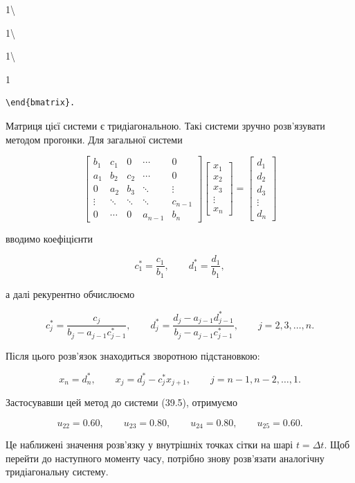 \documentclass[
  ukrainian,
]{article}
\begin{document}
1\textbackslash{}

1\textbackslash{}

1\textbackslash{}

1

\begin{verbatim}
\end{bmatrix}.
\end{verbatim}

Матриця цієї системи є тридіагональною. Такі системи зручно розв'язувати
методом прогонки. Для загальної системи

\[
\begin{bmatrix}
b_1 & c_1 & 0 & \cdots & 0\\
a_1 & b_2 & c_2 & \cdots & 0\\
0 & a_2 & b_3 & \ddots & \vdots\\
\vdots & \ddots & \ddots & \ddots & c_{n-1}\\
0 & \cdots & 0 & a_{n-1} & b_n
\end{bmatrix}
\begin{bmatrix}
x_1\\
x_2\\
x_3\\
\vdots\\
x_n
\end{bmatrix}
=
\begin{bmatrix}
d_1\\
d_2\\
d_3\\
\vdots\\
d_n
\end{bmatrix}
\]

вводимо коефіцієнти

\[
c_1^*=\frac{c_1}{b_1},\qquad d_1^*=\frac{d_1}{b_1},
\]

а далі рекурентно обчислюємо

\[
c_j^*=\frac{c_j}{b_j-a_{j-1}c_{j-1}^*},\qquad d_j^*=\frac{d_j-a_{j-1}d_{j-1}^*}{b_j-a_{j-1}c_{j-1}^*},
\qquad j=2,3,\dots,n.
\]

Після цього розв'язок знаходиться зворотною підстановкою:

\[
x_n=d_n^*,\qquad x_j=d_j^*-c_j^*x_{j+1},\qquad j=n-1,n-2,\dots,1.
\]

Застосувавши цей метод до системи (39.5), отримуємо

\[
u_{22}=0.60,\qquad u_{23}=0.80,\qquad u_{24}=0.80,\qquad u_{25}=0.60.
\]

Це наближені значення розв'язку у внутрішніх точках сітки на шарі
\(t=\Delta t\). Щоб перейти до наступного моменту часу, потрібно знову
розв'язати аналогічну тридіагональну систему.
\end{document}
